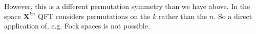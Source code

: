 \documentclass[reprint,twocolumn,amsmath,amssymb,aps]{revtex4-1}
\newcommand{\X}{\mathbf{X}}
\begin{document}
However, this is a different permutation symmetry than we have above. In the space $\X^{kn}$ QFT considers permutations on the $k$ rather than the $n$. So a direct application of, e.g. Fock spaces is not possible.
%
%
%
%


\end{document}
